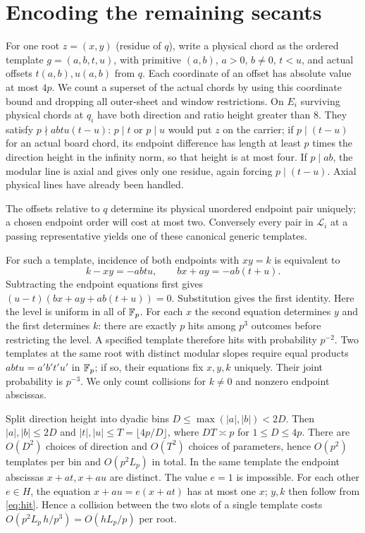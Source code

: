 \section{Encoding the remaining secants}\label{sec:encoding}
For one root $z=(x,y)$ (residue of $q$), write a physical chord as the ordered template $g=(a,b,t,u)$, with primitive $(a,b)$, $a>0$, $b\ne0$, $t<u$, and actual offsets $t(a,b),u(a,b)$ from $q$. Each coordinate of an offset has absolute value at most $4p$. We count a superset of the actual chords by using this coordinate bound and dropping all outer-sheet and window restrictions. On $E_i$ surviving physical chords at $q_i$ have both direction and ratio height greater than 8. They satisfy $p\nmid abtu(t-u)$: $p\mid t$ or $p\mid u$ would put $z$ on the carrier; if $p\mid(t-u)$ for an actual board chord, its endpoint difference has length at least $p$ times the direction height in the infinity norm, so that height is at most four. If $p\mid ab$, the modular line is axial and gives only one residue, again forcing $p\mid(t-u)$. Axial physical lines have already been handled.

The offsets relative to $q$ determine its physical unordered endpoint pair uniquely; a chosen endpoint order will cost at most two. Conversely every pair in $\mathcal L_i$ at a passing representative yields one of these canonical generic templates.

For such a template, incidence of both endpoints with $xy=k$ is equivalent to
\begin{equation}\label{eq:hit}
 k-xy=-abtu,\qquad bx+ay=-ab(t+u).
\end{equation}
Subtracting the endpoint equations first gives $(u-t)(bx+ay+ab(t+u))=0$. Substitution gives the first identity. Here the level is uniform in all of $\mathbb F_p$. For each $x$ the second equation determines $y$ and the first determines $k$: there are exactly $p$ hits among $p^3$ outcomes before restricting the level. A specified template therefore hits with probability $p^{-2}$. Two templates at the same root with distinct modular slopes require equal products $abtu=a'b't'u'$ in $\mathbb F_p$; if so, their equations fix $x,y,k$ uniquely. Their joint probability is $p^{-3}$. We only count collisions for $k\ne0$ and nonzero endpoint abscissas.

Split direction height into dyadic bins $D\le\max(|a|,|b|)<2D$. Then $|a|,|b|\le 2D$ and $|t|,|u|\le T=\lfloor4p/D\rfloor$, where $DT\asymp p$ for $1\le D\le4p$. There are $O(D^2)$ choices of direction and $O(T^2)$ choices of parameters, hence $O(p^2)$ templates per bin and $O(p^2L_p)$ in total. In the same template the endpoint abscissas $x+at,x+au$ are distinct. The value $e=1$ is impossible. For each other $e\in H$, the equation $x+au=e(x+at)$ has at most one $x$; $y,k$ then follow from \eqref{eq:hit}. Hence a collision between the two slots of a single template costs $O(p^2 L_p\,h/p^3)=O(hL_p/p)$ per root.

